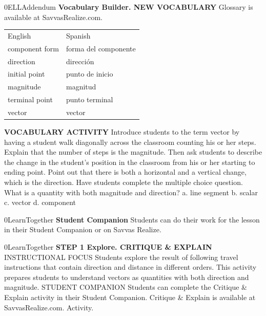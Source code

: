 \documentclass{article}
\newenvironment{te-addendum}[2]{}{}     %
\newcommand{\answer}[1]{}               %
\newcommand{\placeholder}[2]{}          %
\begin{document}
\begin{te-addendum}{0}{ELLAddendum}
\textbf{Vocabulary Builder. NEW VOCABULARY}
Glossary is available at SavvasRealize.com.
\begin{tabular}{ll}
English & Spanish \\
component form & forma del componente \\
direction & dirección \\
initial point & punto de inicio \\
magnitude & magnitud \\
terminal point & punto terminal \\
vector & vector \\
\end{tabular}
\textbf{VOCABULARY ACTIVITY}
Introduce students to the term vector by having a student walk diagonally across the classroom counting his or her steps. Explain that the number of steps is the magnitude. Then ask students to describe the change in the student's position in the classroom from his or her starting to ending point. Point out that there is both a horizontal and a vertical change, which is the direction. Have students complete the multiple choice question.
What is a quantity with both magnitude and direction?
a. line segment
b. scalar
c. vector
d. component
\answer{c. vector}
\end{te-addendum}
\begin{te-addendum}{0}{LearnTogether}
\textbf{Student Companion}
Students can do their work for the lesson in their Student Companion or on Savvas Realize.
\placeholder{illustration}{Student Companion cover with purple and blue circular artwork on black, enVision Algebra 2 and SAVVAS.}
\end{te-addendum}
\begin{te-addendum}{0}{LearnTogether}
\textbf{STEP 1 Explore. CRITIQUE \& EXPLAIN}
INSTRUCTIONAL FOCUS Students explore the result of following travel instructions that contain direction and distance in different orders. This activity prepares students to understand vectors as quantities with both direction and magnitude.
STUDENT COMPANION Students can complete the Critique \& Explain activity in their Student Companion.
Critique \& Explain is available at SavvasRealize.com. Activity.
\end{te-addendum}
\end{document}
